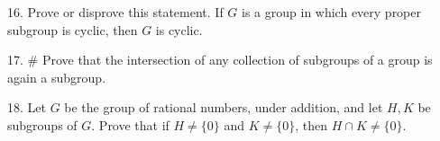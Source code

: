 \begin{mdframed}[style=darkAnswer,frametitle={Joe Starr}]
    
\end{mdframed}
\newpage
\begin{mdframed}[style=darkQuesion]
  16. Prove or disprove this statement. If $G$ is a group in which every proper subgroup is cyclic, then $G$ is cyclic.
    
\end{mdframed}

\begin{mdframed}[style=darkAnswer,frametitle={Joe Starr}]
    
\end{mdframed}
\newpage
\begin{mdframed}[style=darkQuesion]
  17. $\#$ Prove that the intersection of any collection of subgroups of a group is again a subgroup.
    
\end{mdframed}

\begin{mdframed}[style=darkAnswer,frametitle={Joe Starr}]
    
\end{mdframed}
\newpage
\begin{mdframed}[style=darkQuesion]
  18. Let $G$ be the group of rational numbers, under addition, and let $H, K$ be subgroups
  of $G .$ Prove that if $H \neq\{0\}$ and $K \neq\{0\}$, then $H \cap K \neq\{0\}$.
    
\end{mdframed}

